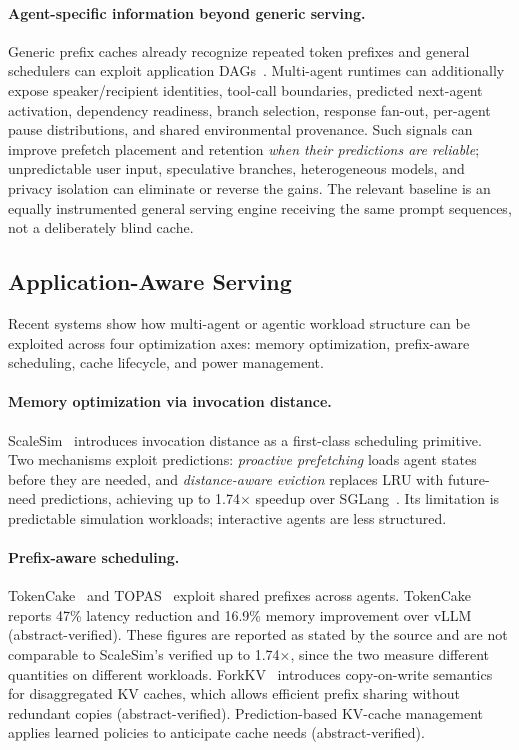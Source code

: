 \paragraph*{Agent-specific information beyond generic serving.} Generic prefix caches already recognize repeated token prefixes and general schedulers can exploit application DAGs~\cite{parrot2024}. Multi-agent runtimes can additionally expose speaker/recipient identities, tool-call boundaries, predicted next-agent activation, dependency readiness, branch selection, response fan-out, per-agent pause distributions, and shared environmental provenance. Such signals can improve prefetch placement and retention \emph{when their predictions are reliable}; unpredictable user input, speculative branches, heterogeneous models, and privacy isolation can eliminate or reverse the gains. The relevant baseline is an equally instrumented general serving engine receiving the same prompt sequences, not a deliberately blind cache.

\subsection{Application-Aware Serving}\label{sec:infra_scalesim}

Recent systems show how multi-agent or agentic workload structure can be exploited across four optimization axes: memory optimization, prefix-aware scheduling, cache lifecycle, and power management.

\paragraph*{Memory optimization via invocation distance.}
ScaleSim~\cite{zhou2026} introduces invocation distance as a first-class scheduling primitive. Two mechanisms exploit predictions: \emph{proactive prefetching} loads agent states before they are needed, and \emph{distance-aware eviction} replaces LRU with future-need predictions, achieving up to 1.74$\times$ speedup over SGLang~\cite{zhou2026}. Its limitation is predictable simulation workloads; interactive agents are less structured.

\paragraph*{Prefix-aware scheduling.}
TokenCake~\cite{tokencake2025} and TOPAS~\cite{topas2026} exploit shared prefixes across agents. TokenCake reports 47\% latency reduction and 16.9\% memory improvement over vLLM (abstract-verified). These figures are reported as stated by the source and are not comparable to ScaleSim's verified up to 1.74$\times$, since the two measure different quantities on different workloads. ForkKV~\cite{forkkv2026} introduces copy-on-write semantics for disaggregated KV caches, which allows efficient prefix sharing without redundant copies (abstract-verified). Prediction-based KV-cache management~\cite{predkvcache2026} applies learned policies to anticipate cache needs (abstract-verified).

